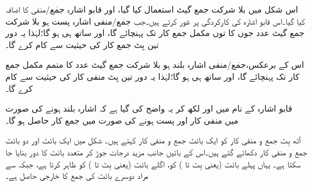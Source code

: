 اس شکل میں بلا شرکت جمع گیٹ استعمال کیا گیا، اور قابو اشارہ {{$\overline{\text{جمع}}$}/منفی} کا اضافہ کیا گیا۔اس قابو اشارہ کی کارکردگی پر غور کرتے ہیں۔جب {{$\overline{\text{جمع}}$}/منفی} اشارہ پست ہو بلا شرکت جمع گیٹ عدد  جوں کا توں مکمل جمع کار تک پہنچائے گا، اور ساتھ ہی ہو گا؛لہٰذا یہ دور تین بِٹ جمع کار کی حیثیت سے کام کرے گا۔

اس کے برعکس،{{$\overline{\text{جمع}}$}/منفی} اشارہ بلند ہو بلا شرکت جمع گیٹ عدد  کا متمم  مکمل جمع کار تک پہنچائے گا، اور ساتھ ہی ہو گا؛لہٰذا یہ دور تین بِٹ منفی کار کی حیثیت سے کام کرے گا۔
	
قابو اشارہ کے نام میں  اور  لکھ کر یہ واضح کی گیا ہے کہ اشارہ بلند ہونے کی صورت میں منفی کار اور پست ہونے کی صورت میں جمع کار حاصل ہو گا۔

	
آٹھ بِٹ جمع و منفی کار کو ایک بائٹ جمع و منفی کار کہتے ہیں۔ شکل  میں ایک بائٹ اور دو بائٹ جمع و منفی کار دکھائے گئے ہیں۔اس کے بائیں جانب مزید درجات جوڑ کر متعدد بائٹ کا دور بنایا جا سکتا ہے۔ یہاں  پہلے بائٹ (یعنی بِٹ  تا ) کو،  اگلے بائٹ (یعنی بِٹ  تا ) کو ظاہر کرتا ہے، جبکہ  سے مراد دوسرے بائٹ کی جمع کا خارجی حاصل ہے۔

